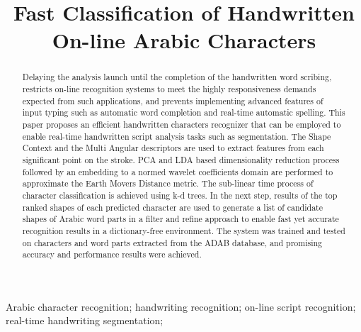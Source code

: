 \documentclass[10pt, conference, compsocconf]{IEEEtran}
\begin{document}
\title{Fast Classification of Handwritten On-line Arabic Characters}

\author{
\and
{}
}


\maketitle

\begin{abstract}
Delaying the analysis launch until the completion of the handwritten word scribing, restricts on-line recognition systems to meet the highly responsiveness demands expected from such applications, and prevents implementing advanced features of input typing such as automatic word completion and real-time automatic spelling.
This paper proposes an efficient handwritten characters recognizer that can be employed to enable real-time handwritten script analysis tasks such as segmentation.
The Shape Context and the Multi Angular descriptors are used to extract features from each significant point on the stroke. 
PCA and LDA based dimensionality reduction process followed by an embedding to a normed wavelet coefficients domain are performed to approximate the Earth Movers Distance metric.
The sub-linear time process of character classification is achieved using k-d trees.
In the next step, results of the top ranked shapes of each predicted character are used to generate a list of candidate shapes of Arabic word parts in a filter and refine approach to enable fast yet accurate recognition results in a dictionary-free environment.
The system was trained and tested on characters and word parts extracted from the ADAB database, and promising accuracy and performance results were achieved.\\
\end{abstract}

\begin{IEEEkeywords}
Arabic character recognition; handwriting recognition; on-line script recognition; real-time handwriting segmentation;
\end{IEEEkeywords}
\end{document}
